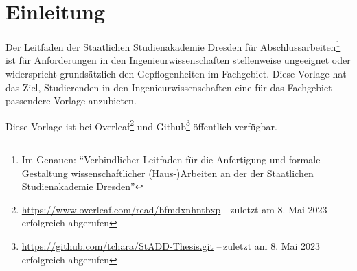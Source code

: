 \chapter{Einleitung}\label{chap:Intro}
Der Leitfaden der Staatlichen Studienakademie Dresden für Abschlussarbeiten\footnote{\label{fn:Leitfaden}Im Genauen: \enquote{Verbindlicher Leitfaden für die Anfertigung und formale Gestaltung wissenschaftlicher (Haus-)Arbeiten an der der Staatlichen Studienakademie Dresden}} ist für Anforderungen in den Ingenieurwissenschaften stellenweise ungeeignet oder widerspricht grundsätzlich den Gepflogenheiten im Fachgebiet. Diese Vorlage hat das Ziel, Studierenden in den Ingenieurwissenschaften eine für das Fachgebiet passendere Vorlage anzubieten.

Diese Vorlage ist bei Overleaf\footnote{\url{https://www.overleaf.com/read/bfmdxnhntbxp} --\,zuletzt am 8. Mai 2023 erfolgreich abgerufen} und Github\footnote{\url{https://github.com/tchara/StADD-Thesis.git} --\,zuletzt am 8. Mai 2023 erfolgreich abgerufen} öffentlich verfügbar.


